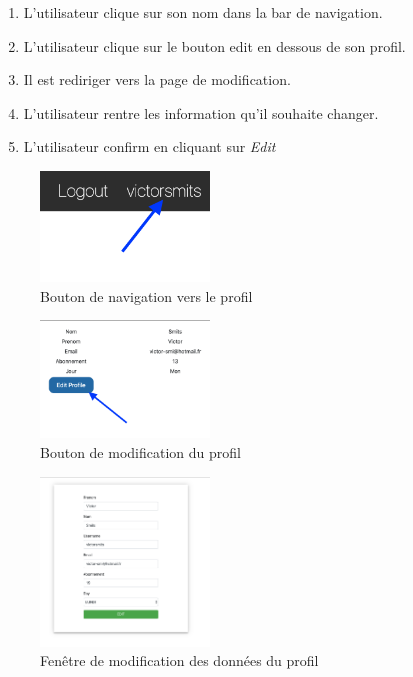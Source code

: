 \begin{enumerate}
	\item L'utilisateur clique sur son nom dans la bar de navigation.
	\item L'utilisateur clique sur le bouton edit en dessous de son profil. 
	\item Il est rediriger vers la page de modification. 
	\item L'utilisateur rentre les information qu'il souhaite changer. 
	\item L'utilisateur confirm en cliquant sur \textit{Edit}
\end{enumerate}

\vspace{\baselineskip}
\begin{figure}[h]
	\includegraphics[width=0.4\textwidth,center]{Figures/us7-1}
	\caption{Bouton de navigation vers le profil}
\end{figure}

\vspace{\baselineskip}
\begin{figure}[h]
	\includegraphics[width=0.4\textwidth,center]{Figures/us8-1}
	\caption{Bouton de modification du profil}
\end{figure}

\newpage
\begin{figure}[h]
	\includegraphics[width=0.4\textwidth,center]{Figures/us8-2}
	\caption{Fenêtre de modification des données du profil}
\end{figure}
